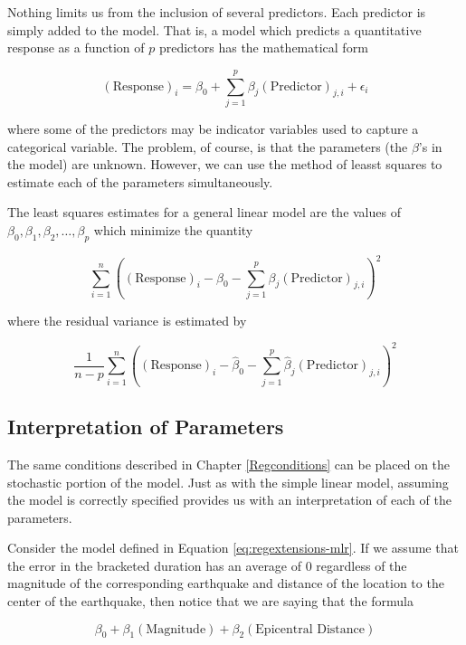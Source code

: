 \documentclass[]{book}
\theoremstyle{plain}
\theoremstyle{mydefn}
\theoremstyle{myexmpl}
\theoremstyle{remark}
\let\BeginKnitrBlock\begin \let\EndKnitrBlock\end
\let\BeginKnitrBlock\begin \let\EndKnitrBlock\end
\begin{document}
Nothing limits us from the inclusion of several predictors. Each
predictor is simply added to the model. That is, a model which predicts
a quantitative response as a function of \(p\) predictors has the
mathematical form

\[(\text{Response})_i = \beta_0 + \sum_{j=1}^{p} \beta_j (\text{Predictor})_{j,i} + \epsilon_i\]

where some of the predictors may be indicator variables used to capture
a categorical variable. The problem, of course, is that the parameters
(the \(\beta\)'s in the model) are unknown. However, we can use the
method of leasst squares to estimate each of the parameters
simultaneously.

\BeginKnitrBlock{definition}[General Least Squares Estimates]
\protect\hypertarget{def:defn-mlr-least-squares-estimates}{}{\label{def:defn-mlr-least-squares-estimates}
{} }The least squares
estimates for a general linear model are the values of
\(\beta_0, \beta_1, \beta_2, \dotsc, \beta_p\) which minimize the
quantity

\[\sum_{i=1}^n \left((\text{Response})_i - \beta_0 - \sum_{j=1}^{p} \beta_j(\text{Predictor})_{j,i}\right)^2\]

where the residual variance is estimated by

\[\frac{1}{n-p} \sum_{i=1}^n \left((\text{Response})_i - \widehat{\beta}_0 - \sum_{j=1}^{p} \widehat{\beta}_j(\text{Predictor})_{j,i}\right)^2\]
\EndKnitrBlock{definition}

\subsection{Interpretation of
Parameters}\label{interpretation-of-parameters}

The same conditions described in Chapter \ref{Regconditions} can be
placed on the stochastic portion of the model. Just as with the simple
linear model, assuming the model is correctly specified provides us with
an interpretation of each of the parameters.

Consider the model defined in Equation \eqref{eq:regextensions-mlr}. If we
assume that the error in the bracketed duration has an average of 0
regardless of the magnitude of the corresponding earthquake and distance
of the location to the center of the earthquake, then notice that we are
saying that the formula

\[\beta_0 + \beta_1(\text{Magnitude}) + \beta_2(\text{Epicentral Distance})\]
\end{document}
